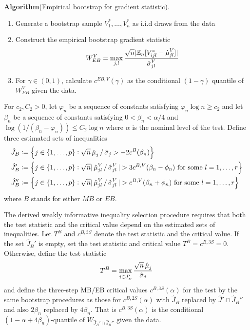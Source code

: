 \textbf{Algorithm}(Empirical bootstrap for gradient statistic).
\begin{enumerate}
	\item Generate a bootstrap sample $V_1^*, \dots, V_n^*$ as i.i.d draws from the data
	\item Construct the empirical bootstrap gradient statistic 
	\begin{equation}
		\label{eq:CCK-45} 
		W_{EB}^V = \max_{j,l} \frac{\sqrt{n}|\mathbb{E}_n[V_{ijl}^*-\operatorname{\hat{\mu}}_{jl}^V]|}{\operatorname{\hat{\sigma}}_{jl}^V}
	\end{equation}
	\item For $\gamma \in (0,1)$, calculate $c^{EB,V}(\gamma)$ as the conditional $(1-\gamma)$ quantile of $W_{EB}^V$ given the data.
\end{enumerate}

For $c_2, C_2 > 0$, let $\varphi_n$ be a sequence of constants satisfying $\varphi_n\log n \geq c_2$ and let $\beta_n$ be a sequence of constants satisfying $0< \beta_n < \alpha/4$ and $\log\left(1/(\beta_n - \varphi_n)\right) \leq C_2\log n$ where $\alpha$ is the nominal level of the test. Define three estimated sets of inequalities 
\begin{align*}
    \hat{J}_B &:= \left\{j \in \{1,\dots, p\}: \sqrt{n}\operatorname{\hat{\mu}}_j/\operatorname{\hat{\sigma}}_j > -2c^B(\beta_n)\right\} \\
    \hat{J}_B' &:= \left\{j \in \{1,\dots, p\}: \sqrt{n}|\operatorname{\hat{\mu}}_{jl}^V/\operatorname{\hat{\sigma}}_{jl}^V| > 3c^{B,V}(\beta_n - \phi_n)\text{ for some }l= 1,\dots,r\right\} \\
    \hat{J}_B'' &:= \left\{j \in \{1,\dots, p\}: \sqrt{n}|\operatorname{\hat{\mu}}_{jl}^V/\operatorname{\hat{\sigma}}_{jl}^V| > c^{B,V}(\beta_n + \phi_n)\text{ for some }l= 1,\dots,r\right\} 
\end{align*}
where $B$ stands for either $MB$ or $EB$.

The derived weakly informative inequality selection procedure requires that both the test statistic and the critical value depend on the estimated sets of inequalities. Let $T^B$ and $c^{B,3S}$ denote the test statistic and the critical value. If the set $\hat{J}_B'$ is empty, set the test statistic and critical value $T^B = c^{B,3S} = 0$. Otherwise, define the test statistic 
\[T^B = \max_{j\in \hat{J}_B'}\frac{\sqrt{n}\operatorname{\hat{\mu}}_j}{\operatorname{\hat{\sigma}}_j}\]
and define the three-step MB/EB critical values $c^{B,3S}(\alpha)$ for the test by the same bootstrap procedures as those for $c^{B,2S}(\alpha)$ with $\hat{J}_B$ replaced by $\hat{J}'\cap\hat{J}_B''$ and also $2\beta_n$ replaced by $4\beta_n$. That is $c^{B,3S}(\alpha)$ is the conditional $(1-\alpha + 4\beta_n)$-quantile of $W_{\hat{J}_B'\cap\hat{J}_B''}$ given the data. 

